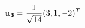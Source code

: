 \documentclass[preview]{standalone}
\begin{document}
\begin{align*}
\mathbf{u_3} = { 1 \over \sqrt{14} } (3, 1, -2)^T
\end{align*}
\end{document}
